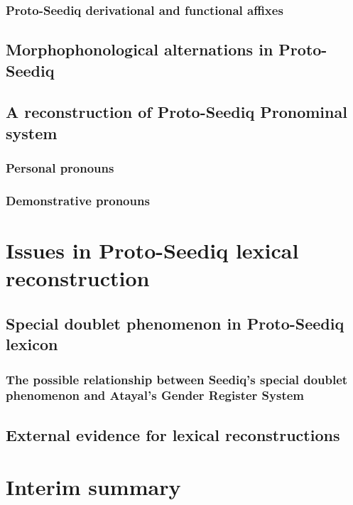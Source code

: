 \documentclass[master]{NTHUthesis}
\begin{document}
\subsubsection{Proto-Seediq derivational and functional affixes}

\subsection{Morphophonological alternations in Proto-Seediq}

\subsection{A reconstruction of Proto-Seediq Pronominal system}

\subsubsection{Personal pronouns}

\subsubsection{Demonstrative pronouns}

\section{Issues in Proto-Seediq lexical reconstruction}

\subsection{Special doublet phenomenon in Proto-Seediq lexicon}

\subsubsection{The possible relationship between Seediq's special doublet phenomenon and Atayal's Gender Register System}

\subsection{External evidence for lexical reconstructions}

\section{Interim summary}
\lipsum[1]
\end{document}
